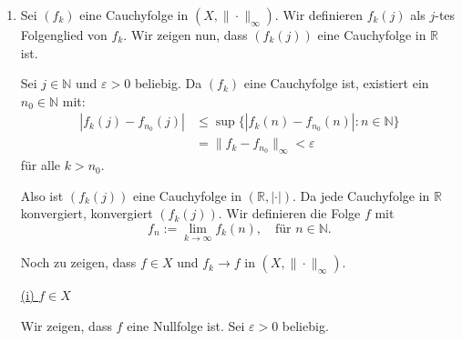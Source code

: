 \documentclass[a4paper,12pt]{article}
\begin{document}
\begin{enumerate}[label=\alph*)]
\begin{enumerate}[label=(\roman*)]
    \end{enumerate}

    \item
    Sei $(f_k)$ eine Cauchyfolge in $(X, \|\cdot\|_\infty)$.
    Wir definieren $f_k(j)$ als $j$-tes Folgenglied von $f_k$.
    Wir zeigen nun, dass $(f_k(j))$ eine Cauchyfolge in $\mathbb{R}$ ist.

    Sei $j \in \mathbb{N}$ und $\varepsilon > 0$ beliebig.
    Da $(f_k)$ eine Cauchyfolge ist, existiert ein $n_0 \in \mathbb{N}$ mit:
    \begin{align*}
        |f_k(j) - f_{n_0}(j)| &\leq \sup\{|f_k(n) - f_{n_0}(n)| : n \in \mathbb{N}\} \\
                               &= \|f_k - f_{n_0}\|_\infty < \varepsilon
    \end{align*}
    für alle $k > n_0$.

    Also ist $(f_k(j))$ eine Cauchyfolge in $(\mathbb{R}, |\cdot|)$.
    Da jede Cauchyfolge in $\mathbb{R}$ konvergiert, konvergiert $(f_k(j))$.
    Wir definieren die Folge $f$ mit
    \[
        f_n := \lim_{k \to \infty} f_k(n), \quad \text{für } n \in \mathbb{N}.
    \]

    Noch zu zeigen, dass $f \in X$ und $f_k \to f$ in $(X, \|\cdot\|_\infty)$.

    \underline{(i) $f \in X$}

    Wir zeigen, dass $f$ eine Nullfolge ist.
    Sei $\varepsilon > 0$ beliebig.


\end{enumerate}
\end{document}
